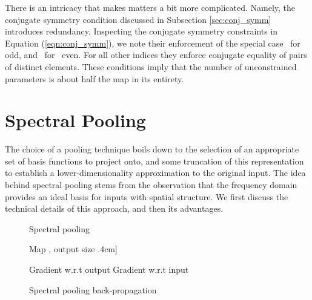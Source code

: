 \documentclass{article} \usepackage{nips15submit_e,times}
\begin{document}
There is an intricacy that makes matters a bit more complicated. Namely, the conjugate symmetry condition discussed in Subsection \ref{sec:conj_symm} introduces redundancy. Inspecting the conjugate symmetry constraints in Equation (\ref{eqn:conj_symm}), we note their enforcement of the special case~ for~ odd, and~ for~ even. For all other indices they enforce conjugate equality of pairs of distinct elements. These conditions imply that the number of unconstrained parameters is about half the map in its entirety.

\section{Spectral Pooling}
\label{sec:spectral_pooling}

The choice of a pooling technique boils down to the selection of an appropriate set of basis functions to project onto, and some truncation of this representation to establish a lower-dimensionality approximation to the original input. The idea behind spectral pooling stems from the observation that the frequency domain provides an ideal basis for inputs with spatial structure. We first discuss the technical details of this approach, and then its advantages.

\begin{figure}[bbb!]
\begin{minipage}[t]{0.45\textwidth}
\begin{algorithm}[H]
\caption{Spectral pooling}
\label{algo:sp}
\begin{algorithmic}[1]
  \REQUIRE Map , output size 
  \0.4cm]
\end{algorithmic}
\end{algorithm}
\end{minipage}
 \hfill
 \begin{minipage}[t]{0.5\textwidth}
 \begin{algorithm}[H]
\caption{Spectral pooling back-propagation}
\label{algo:sp_grad}
\begin{algorithmic}[1]
\footnotesize
  \REQUIRE Gradient w.r.t output 
  \ENSURE Gradient w.r.t input 
  \STATE 
  \STATE 
  \STATE 
  \STATE 
  \STATE 
\end{algorithmic}
\end{algorithm}
 \end{minipage}
\end{figure}
\end{document}
